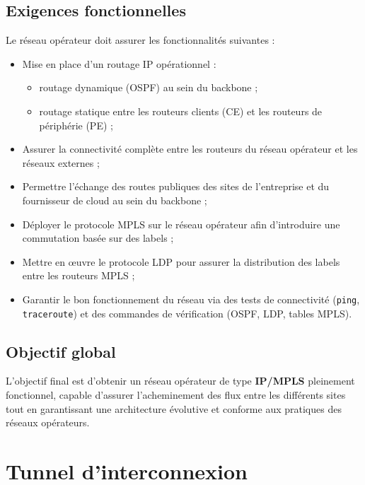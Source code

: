 \documentclass[11pt,a4paper]{memoir}%
\begin{document}
\section{Exigences fonctionnelles}

Le réseau opérateur doit assurer les fonctionnalités suivantes :

\begin{itemize}
	\item Mise en place d’un routage IP opérationnel :
	\begin{itemize}
		\item routage dynamique (OSPF) au sein du backbone ;
		\item routage statique entre les routeurs clients (CE) et les routeurs de périphérie (PE) ;
	\end{itemize}
	
	\item Assurer la connectivité complète entre les routeurs du réseau opérateur et les réseaux externes ;
	
	\item Permettre l’échange des routes publiques des sites de l’entreprise et du fournisseur de cloud au sein du backbone ;
	
	\item Déployer le protocole MPLS sur le réseau opérateur afin d’introduire une commutation basée sur des labels ;
	
	\item Mettre en œuvre le protocole LDP pour assurer la distribution des labels entre les routeurs MPLS ;
	
	\item Garantir le bon fonctionnement du réseau via des tests de connectivité (\texttt{ping}, \texttt{traceroute}) et des commandes de vérification (OSPF, LDP, tables MPLS).
\end{itemize}

\section{Objectif global}

L’objectif final est d’obtenir un réseau opérateur de type \textbf{IP/MPLS} pleinement fonctionnel, capable d’assurer l’acheminement des flux entre les différents sites tout en garantissant une architecture évolutive et conforme aux pratiques des réseaux opérateurs.
	

\chapter{Tunnel d'interconnexion}
	
\end{document}
